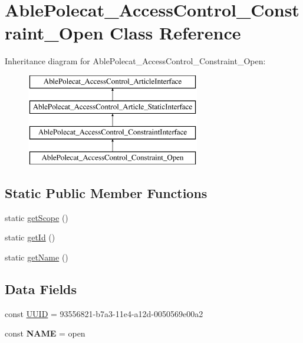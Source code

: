 \hypertarget{class_able_polecat___access_control___constraint___open}{}\section{Able\+Polecat\+\_\+\+Access\+Control\+\_\+\+Constraint\+\_\+\+Open Class Reference}
\label{class_able_polecat___access_control___constraint___open}
Inheritance diagram for Able\+Polecat\+\_\+\+Access\+Control\+\_\+\+Constraint\+\_\+\+Open\+:\begin{figure}[H]
\begin{center}
\leavevmode
\includegraphics[height=4.000000cm]{class_able_polecat___access_control___constraint___open}
\end{center}
\end{figure}
\subsection*{Static Public Member Functions}
\begin{DoxyCompactItemize}
\item 
static \hyperlink{class_able_polecat___access_control___constraint___open_ad9ade868bd136d32967059d1cccb3e92}{get\+Scope} ()
\item 
static \hyperlink{class_able_polecat___access_control___constraint___open_acfaa3a96d0cb5a4c0d4d710dcba41e9e}{get\+Id} ()
\item 
static \hyperlink{class_able_polecat___access_control___constraint___open_a4ef9bd37ba3ce8a13c1e8bcf4f72a630}{get\+Name} ()
\end{DoxyCompactItemize}
\subsection*{Data Fields}
\begin{DoxyCompactItemize}
\item 
const \hyperlink{class_able_polecat___access_control___constraint___open_a74b892c8c0b86bf9d04c5819898c51e7}{U\+U\+I\+D} = \textquotesingle{}93556821-\/b7a3-\/11e4-\/a12d-\/0050569e00a2\textquotesingle{}
\item 
\hypertarget{class_able_polecat___access_control___constraint___open_a244352f035b82b20b0efa506167fd862}{}const {\bfseries N\+A\+M\+E} = \textquotesingle{}open\textquotesingle{}\label{class_able_polecat___access_control___constraint___open_a244352f035b82b20b0efa506167fd862}

\end{DoxyCompactItemize}


